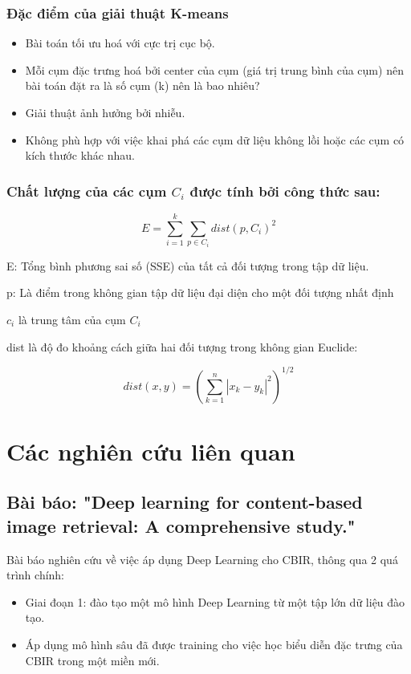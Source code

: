 \documentclass[a4paper,14pt]{extreport}
\begin{document}
\subsubsection*{ Đặc điểm của giải thuật K-means }

\begin{itemize}
        \item Bài toán tối ưu hoá với cực trị cục bộ.
        \item Mỗi cụm đặc trưng hoá bởi center của cụm (giá trị trung bình của cụm) nên bài toán đặt ra là số cụm (k) nên là bao nhiêu?
        \item Giải thuật ảnh hưởng bởi nhiễu.
        \item Không phù hợp với việc khai phá các cụm dữ liệu không lồi hoặc các cụm có kích thước khác nhau.
\end{itemize}

\subsubsection*{ Chất lượng của các cụm $C_i$ được tính bởi công thức sau: }

\[ E = \sum_{i=1}^{k} \sum_{p \in C_i} dist(p,C_i)^2 \]

E: Tổng bình phương sai số (SSE) của tất cả đối tượng trong tập dữ liệu.

p: Là điểm trong không gian tập dữ liệu đại diện cho một đối tượng nhất định

$c_i$ là trung tâm của cụm $C_i$

dist là độ đo khoảng cách giữa hai đối tượng trong không gian Euclide:

\[ dist(x,y) = (\sum_{k=1}^{n} |x_k - y_k|^2)^{1/2} \]

\section{Các nghiên cứu liên quan}
\subsection{Bài báo: "Deep learning for content-based image retrieval: A comprehensive study." \cite{paper-1}}

Bài báo nghiên cứu về việc áp dụng Deep Learning cho CBIR, thông qua 2 quá trình chính: 

\begin{itemize}
        \item Giai đoạn 1: đào tạo một mô hình Deep Learning từ một tập lớn dữ liệu đào tạo.
        \item Áp dụng mô hình sâu đã được training cho việc học biểu diễn đặc trưng của CBIR trong một miền mới.
\end{itemize}
\end{document}
